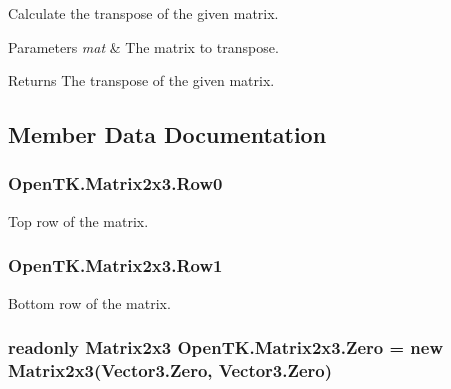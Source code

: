 Calculate the transpose of the given matrix. 


\begin{DoxyParams}{Parameters}
{\em mat} & The matrix to transpose.\\
\hline
\end{DoxyParams}
\begin{DoxyReturn}{Returns}
The transpose of the given matrix.
\end{DoxyReturn}


\subsection{Member Data Documentation}
\hypertarget{struct_open_t_k_1_1_matrix2x3_a2ad60d16151058fb45a911b1362fd66f}{
\subsubsection[{Row0}]{ Open\-T\-K.\-Matrix2x3.\-Row0}}\label{struct_open_t_k_1_1_matrix2x3_a2ad60d16151058fb45a911b1362fd66f}


Top row of the matrix. 

\hypertarget{struct_open_t_k_1_1_matrix2x3_a1e0c5f4be418cca30e3fb140e37c71c3}{
\subsubsection[{Row1}]{ Open\-T\-K.\-Matrix2x3.\-Row1}}\label{struct_open_t_k_1_1_matrix2x3_a1e0c5f4be418cca30e3fb140e37c71c3}


Bottom row of the matrix. 

\hypertarget{struct_open_t_k_1_1_matrix2x3_aff6a7521b992e7be7caa844f5c81c2ef}{
\subsubsection[{Zero}]{\setlength{\rightskip}{0pt plus 5cm}readonly {\bf Matrix2x3} Open\-T\-K.\-Matrix2x3.\-Zero = new {\bf Matrix2x3}(Vector3.\-Zero, Vector3.\-Zero)\hspace{0.3cm}{\ttfamily [static]}}}\label{struct_open_t_k_1_1_matrix2x3_aff6a7521b992e7be7caa844f5c81c2ef}


